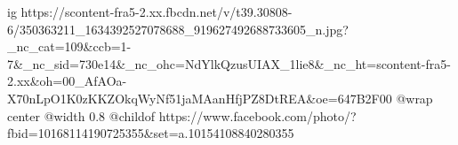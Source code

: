  
 
 
 
 

\ifcmt
  ig https://scontent-fra5-2.xx.fbcdn.net/v/t39.30808-6/350363211_1634392527078688_919627492688733605_n.jpg?_nc_cat=109&ccb=1-7&_nc_sid=730e14&_nc_ohc=NdYlkQzusUIAX_1lie8&_nc_ht=scontent-fra5-2.xx&oh=00_AfAOa-X70nLpO1K0zKKZOkqWyNf51jaMAanHfjPZ8DtREA&oe=647B2F00
  @wrap center
  @width 0.8
  @childof https://www.facebook.com/photo/?fbid=10168114190725355&set=a.10154108840280355
\fi
